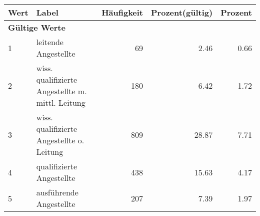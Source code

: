      \begin{longtable}{lXrrr}
     \toprule
     \textbf{Wert} & \textbf{Label} & \textbf{Häufigkeit} & \textbf{Prozent(gültig)} & \textbf{Prozent} \\
     \endhead
     \midrule
     \multicolumn{5}{l}{\textbf{Gültige Werte}}\\

     1 &
     \multicolumn{1}{X}{ leitende Angestellte   } &


       \num{69} &
       \num[round-mode=places,round-precision=2]{2.46} &
         \num[round-mode=places,round-precision=2]{0.66} \\

     2 &
     \multicolumn{1}{X}{ wiss. qualifizierte Angestellte m. mittl. Leitung   } &


       \num{180} &
       \num[round-mode=places,round-precision=2]{6.42} &
         \num[round-mode=places,round-precision=2]{1.72} \\

     3 &
     \multicolumn{1}{X}{ wiss. qualifizierte Angestellte o. Leitung   } &


       \num{809} &
       \num[round-mode=places,round-precision=2]{28.87} &
         \num[round-mode=places,round-precision=2]{7.71} \\

     4 &
     \multicolumn{1}{X}{ qualifizierte Angestellte   } &


       \num{438} &
       \num[round-mode=places,round-precision=2]{15.63} &
         \num[round-mode=places,round-precision=2]{4.17} \\

     5 &
     \multicolumn{1}{X}{ ausführende Angestellte   } &


       \num{207} &
       \num[round-mode=places,round-precision=2]{7.39} &
         \num[round-mode=places,round-precision=2]{1.97} \\


\end{longtable}
